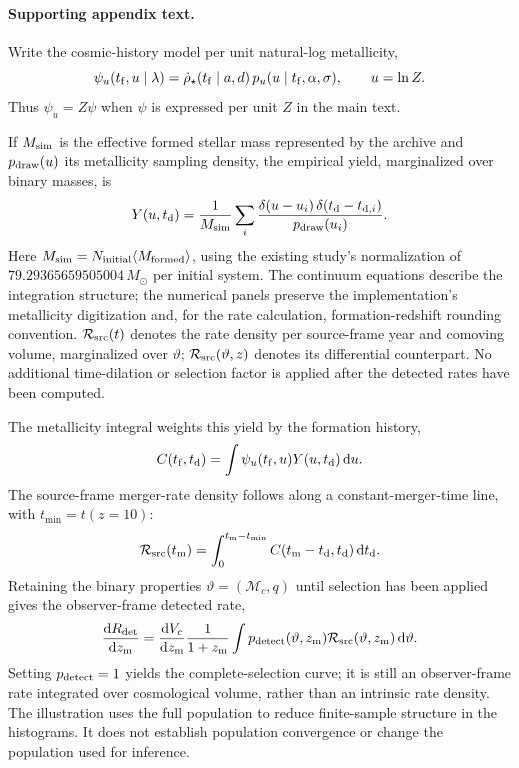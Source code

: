 \paragraph{Supporting appendix text.}
Write the cosmic-history model per unit natural-log metallicity,
\begin{equation}
\psi_u(t_{\rm f},u\mid\lambda)
=\dot\rho_\star(t_{\rm f}\mid a,d)\,p_u(u\mid t_{\rm f},\alpha,\sigma),
\qquad u=\ln Z.
\label{eq:ci_illustration_formation}
\end{equation}
Thus $\psi_u=Z\psi$ when $\psi$ is expressed per unit $Z$ in the main text.

If $M_{\rm sim}$ is the effective formed stellar mass represented by the
archive and $p_{\rm draw}(u)$ its metallicity sampling density, the empirical
yield, marginalized over binary masses, is
\begin{equation}
Y(u,t_{\rm d}) = \frac{1}{M_{\rm sim}}\sum_i
\frac{\delta(u-u_i)\,\delta(t_{\rm d}-t_{{\rm d},i})}
{p_{\rm draw}(u_i)}.
\label{eq:ci_illustration_yield}
\end{equation}
Here $M_{\rm sim}=N_{\rm initial}\langle M_{\rm formed}\rangle$, using the
existing study's normalization of $79.29365659505004\,M_\odot$ per initial
system. The continuum equations describe the integration structure; the
numerical panels preserve the implementation's metallicity digitization and,
for the rate calculation, formation-redshift rounding convention.
$\mathcal R_{\rm src}(t)$ denotes the rate density per source-frame year and
comoving volume, marginalized over $\vartheta$;
$\mathcal R_{\rm src}(\vartheta,z)$ denotes its differential counterpart.
No additional time-dilation or selection factor is applied after the detected
rates have been computed.

The metallicity integral weights this yield by the formation history,
\begin{equation}
C(t_{\rm f},t_{\rm d})=
\int\psi_u(t_{\rm f},u)Y(u,t_{\rm d})\,\mathrm{d}u.
\label{eq:ci_illustration_contribution}
\end{equation}
The source-frame merger-rate density follows along a constant-merger-time
line, with $t_{\min}=t(z=10)$:
\begin{equation}
\mathcal R_{\rm src}(t_{\rm m})=
\int_0^{t_{\rm m}-t_{\min}}
C(t_{\rm m}-t_{\rm d},t_{\rm d})\,\mathrm{d}t_{\rm d}.
\label{eq:ci_illustration_merger}
\end{equation}
Retaining the binary properties $\vartheta=(\mathcal M_c,q)$ until selection
has been applied gives the observer-frame detected rate,
\begin{equation}
\frac{\mathrm{d}R_{\rm det}}{\mathrm{d}z_{\rm m}}=
\frac{\mathrm{d}V_c}{\mathrm{d}z_{\rm m}}\frac{1}{1+z_{\rm m}}
\int p_{\rm detect}(\vartheta,z_{\rm m})
\mathcal R_{\rm src}(\vartheta,z_{\rm m})\,\mathrm{d}\vartheta.
\label{eq:ci_illustration_detection}
\end{equation}
Setting $p_{\rm detect}=1$ yields the complete-selection curve; it is still
an observer-frame rate integrated over cosmological volume, rather than an
intrinsic rate density. The illustration uses the full population to reduce
finite-sample structure in the histograms. It does not establish population
convergence or change the population used for inference.
